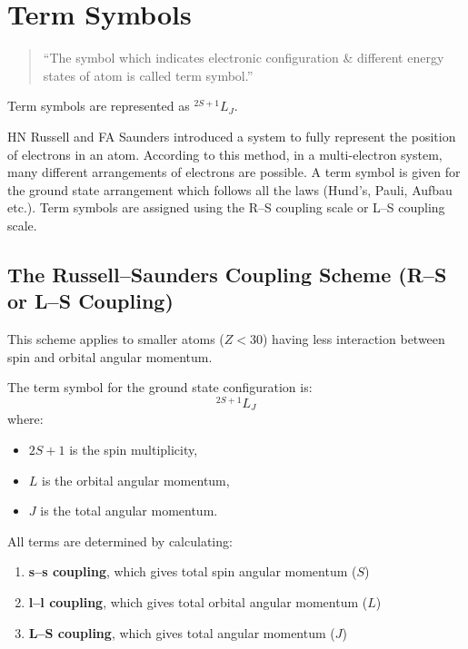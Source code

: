 \documentclass[12pt,a4paper]{article}
\begin{document}
\section{Term Symbols}

\begin{quote}
``The symbol which indicates electronic configuration \& different energy states of atom is called term symbol.''
\end{quote}

Term symbols are represented as $^{2S+1}L_J$.

HN Russell and FA Saunders introduced a system to fully represent the position of electrons in an atom. According to this method, in a multi-electron system, many different arrangements of electrons are possible. A term symbol is given for the ground state arrangement which follows all the laws (Hund's, Pauli, Aufbau etc.). Term symbols are assigned using the R--S coupling scale or L--S coupling scale.

\subsection{The Russell--Saunders Coupling Scheme (R--S or L--S Coupling)}

This scheme applies to smaller atoms ($Z < 30$) having less interaction between spin and orbital angular momentum.

The term symbol for the ground state configuration is:
\[
^{2S+1}L_J
\]
where:
\begin{itemize}
  \item $2S+1$ is the spin multiplicity,
  \item $L$ is the orbital angular momentum,
  \item $J$ is the total angular momentum.
\end{itemize}

All terms are determined by calculating:
\begin{enumerate}
  \item \textbf{s--s coupling}, which gives total spin angular momentum ($S$)
  \item \textbf{l--l coupling}, which gives total orbital angular momentum ($L$)
  \item \textbf{L--S coupling}, which gives total angular momentum ($J$)
\end{enumerate}
\end{document}
